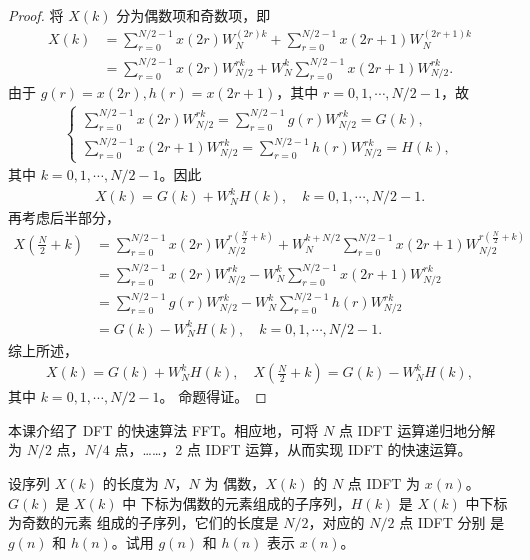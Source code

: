 \begin{proof}
    将 $X(k)$ 分为偶数项和奇数项，即
    \begin{align*}
        X(k) & = \sum_{r = 0}^{N/2 - 1}x(2r)W_N^{(2r)k}
            + \sum_{r = 0}^{N/2 - 1}x(2r + 1)W_N^{(2r + 1)k} \\
        & = \sum_{r = 0}^{N/2 - 1}x(2r)W_{N/2}^{rk}
            + W_N^k\sum_{r = 0}^{N/2 - 1}x(2r + 1)W_{N/2}^{rk}.
    \end{align*}
    由于 $g(r) = x(2r), h(r) = x(2r + 1)$，其中 $r = 0, 1, \cdots, N/2 - 1$，故
    \begin{align*}
        \begin{cases}
            \sum_{r = 0}^{N/2 - 1}x(2r)W_{N/2}^{rk}
                = \sum_{r = 0}^{N/2 - 1}g(r)W_{N/2}^{rk} = G(k), \\
            \sum_{r = 0}^{N/2 - 1}x(2r + 1)W_{N/2}^{rk}
                = \sum_{r = 0}^{N/2 - 1}h(r)W_{N/2}^{rk} = H(k),
        \end{cases}
    \end{align*}
    其中 $k = 0, 1, \cdots, N/2 - 1$。因此
    \begin{align*}
        X(k) = G(k) + W_N^kH(k), \quad k = 0, 1, \cdots, N/2 - 1.
    \end{align*}
    再考虑后半部分，
    \begin{align*}
        X\left(\frac{N}{2} + k\right) & = \sum_{r = 0}^{N/2 - 1}x(2r)W_{N/2}^{r\left(\frac{N}{2} + k\right)}
            + W_N^{k + N/2}\sum_{r = 0}^{N/2 - 1}x(2r + 1)W_{N/2}^{r\left(\frac{N}{2} + k\right)} \\
        & = \sum_{r = 0}^{N/2 - 1}x(2r)W_{N/2}^{rk}
            - W_N^k\sum_{r = 0}^{N/2 - 1}x(2r + 1)W_{N/2}^{rk} \\
        & = \sum_{r = 0}^{N/2 - 1}g(r)W_{N/2}^{rk}
            - W_N^k\sum_{r = 0}^{N/2 - 1}h(r)W_{N/2}^{rk} \\
        & = G(k) - W_N^kH(k), \quad k = 0, 1, \cdots, N/2 - 1.
    \end{align*}
    综上所述，
    \begin{align*}
        X(k) = G(k) + W_N^kH(k), \quad X\left(\frac{N}{2} + k\right) = G(k) - W_N^kH(k),
    \end{align*}
    其中 $k = 0, 1, \cdots, N/2 - 1$。
    命题得证。
\end{proof}

\begin{exercise}
    本课介绍了 DFT 的快速算法 FFT。相应地，可将 $N$ 点 IDFT 运算递归地分解
    为 $N/2$ 点，$N/4$ 点，……，$2$ 点 IDFT 运算，从而实现 IDFT 的快速运算。

    设序列 $X(k)$ 的长度为 $N$，$N$ 为
    偶数，$X(k)$ 的 $N$ 点 IDFT 为 $x(n)$。$G(k)$ 是 $X(k)$ 中
    下标为偶数的元素组成的子序列，$H(k)$ 是 $X(k)$ 中下标为奇数的元素
    组成的子序列，它们的长度是 $N/2$，对应的 $N/2$ 点 IDFT 分别
    是 $g(n)$ 和 $h(n)$。试用 $g(n)$ 和 $h(n)$ 表示 $x(n)$。
\end{exercise}

